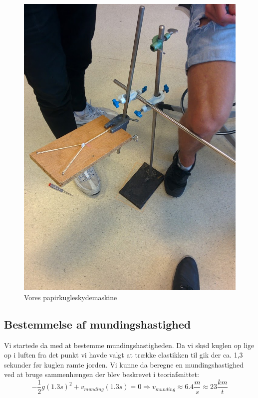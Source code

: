 \documentclass[12pt,a4paper]{article}
\theoremstyle{break}
\theoremstyle{nonumberplain}
\begin{document}
\begin{figure}
\center
\includegraphics[scale=0.2]{papirkuglekastemaskine}
\caption{Vores papirkugleskydemaskine}
\label{maskine}
\end{figure}

\subsection{Bestemmelse af mundingshastighed}
Vi startede da med at bestemme mundingshastigheden. 
Da vi skød kuglen op lige op i luften fra det punkt vi havde valgt at trække elastikken til gik der ca. 1,3 sekunder før kuglen ramte jorden. 
Vi kunne da beregne en mundingshastighed ved at bruge sammenhængen der blev beskrevet i teoriafsnittet:
$$-\frac{1}{2}g(1.3s)^2 + v_{munding}(1.3 s)=0 \Rightarrow v_{munding}\approx6.4 \frac{m}{s}\approx 23 \frac{km}{t}$$
\end{document}
